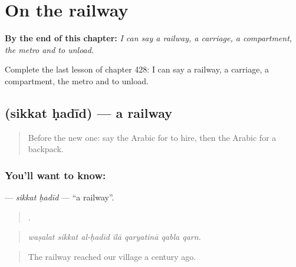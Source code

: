 
\chapter{On the railway}
\label{ch:ar-on-the-railway}

\begin{chapteropening}
\textbf{By the end of this chapter:} \emph{I can say a railway, a carriage, a compartment, the metro and to unload.}

Complete the last lesson of chapter 428: I can say a railway, a carriage, a compartment, the metro and to unload.
\end{chapteropening}

\section[\texorpdfstring{\ar{سكة} \ar{حديد} (sikkat ḥadīd)}{سكة حديد (sikkat ḥadīd)}]{  (sikkat ḥadīd) — a railway}

\label{lesson:AR-C428-sikkat-hadid}



\begin{quote}
Before the new one: say the Arabic for to hire, then the Arabic for a backpack.
\end{quote}

\subsection*{You'll want to know:  }
\textbf{ } — \emph{sikkat ḥadīd} — \textquotedblleft{}a railway\textquotedblright{}.

\begin{quote}
      .
\end{quote}

\begin{quote}
\emph{waṣalat sikkat al-ḥadīd ilā qaryatinā qabla qarn.}
\end{quote}

\begin{quote}
The railway reached our village a century ago.
\end{quote}

